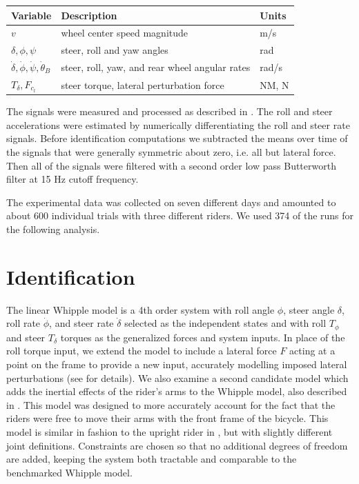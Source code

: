 \documentclass[a4paper]{article}
\begin{document}
\begin{table}
  \begin{tabular}{lll}
    Variable                                            & Description                                    & Units \\
    \hline
    $v$                                                 & wheel center speed magnitude                   & m/s \\
    $\delta,\phi,\psi$                                  & steer, roll and yaw angles                     & rad \\
    $\dot{\delta},\dot{\phi},\dot{\psi},\dot{\theta}_B$ & steer, roll, yaw, and rear wheel angular rates & rad/s \\
    $T_\delta,F_{c_l}$                                  & steer torque, lateral perturbation force       & NM, N
  \end{tabular}
\end{table}

The signals were measured and processed as described in \cite{Moore2012}. The
roll and steer accelerations were estimated by numerically differentiating the
roll and steer rate signals. Before identification computations we subtracted
the means over time of the signals that were generally symmetric about zero,
i.e. all but lateral force.  Then all of the signals were filtered with a
second order low pass Butterworth filter at 15 Hz cutoff frequency.


The experimental data was collected on seven different days and amounted to
about 600 individual trials with three different riders. We used 374 of the
runs for the following analysis.

\section{Identification}
\label{sec:identification}


The linear Whipple model is a 4th order system with roll angle $\phi$, steer
angle $\delta$, roll rate $\dot{\phi}$, and steer rate $\dot{\delta}$ selected
as the independent states and with roll $T_\phi$ and steer $T_\delta$ torques
as the generalized forces and system inputs. In place of the roll torque input,
we extend the model to include a lateral force $F$ acting at a point on the
frame to provide a new input, accurately modelling imposed lateral
perturbations (see \cite{Moore2012} for details).  We also examine a second
candidate model which adds the inertial effects of the rider's arms to the
Whipple model, also described in \cite{Moore2012}. This model was designed to
more accurately account for the fact that the riders were free to move their
arms with the front frame of the bicycle. This model is similar in fashion to
the upright rider in \cite{Schwab2010a}, but with slightly different joint
definitions. Constraints are chosen so that no additional degrees of freedom
are added, keeping the system both tractable and comparable to the benchmarked
Whipple model.
\end{document}
